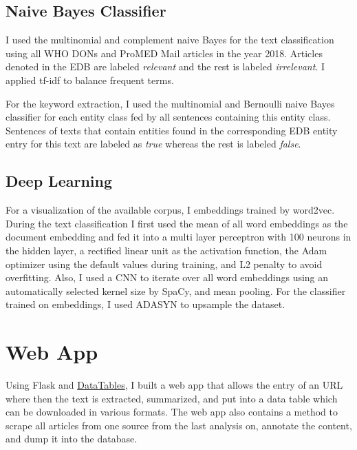 \subsection{Naive Bayes Classifier}
I used the multinomial and complement naive Bayes for the text classification using all WHO DONs and ProMED Mail articles in the year 2018. Articles denoted in the EDB are labeled \emph{relevant} and the rest is labeled \emph{irrelevant}. I applied tf-idf to balance frequent terms.

For the keyword extraction, I used the multinomial and Bernoulli naive Bayes classifier for each entity class fed by all sentences containing this entity class. Sentences of texts that contain entities found in the corresponding EDB entity entry for this text are labeled as \emph{true} whereas the rest is labeled \emph{false}.

\subsection{Deep Learning}
For a visualization of the available corpus, I embeddings trained by word2vec. During the text classification I first used the mean of all word embeddings as the document embedding and fed it into a multi layer perceptron with 100 neurons in the hidden layer, a rectified linear unit as the activation function, the Adam optimizer using the default values during training, and L2 penalty to avoid overfitting.
Also, I used a CNN to iterate over all word embeddings using an automatically selected kernel size by SpaCy, and mean pooling.
For the classifier trained on embeddings, I used ADASYN to upsample the dataset.

\section{Web App}
Using Flask and \href{https://www.datatables.net}{DataTables}, I built a web app that allows the entry of an URL where then the text is extracted, summarized, and put into a data table which can be downloaded in various formats.
The web app also contains a method to scrape all articles from one source from the last analysis on, annotate the content, and dump it into the database.
